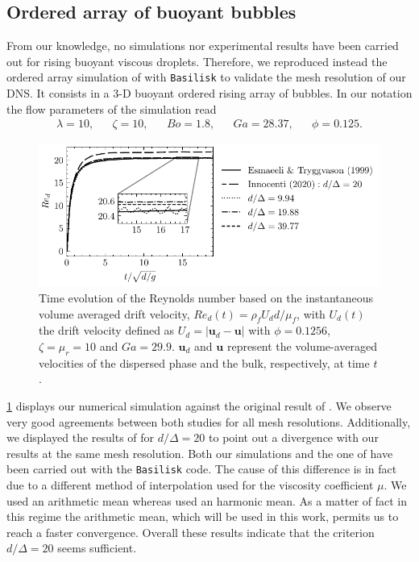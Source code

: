 \documentclass[11pt]{My_preprint}
\begin{document}
\subsection{Ordered array of buoyant bubbles}

From our knowledge, no simulations nor experimental results have been carried out for rising buoyant viscous droplets. 
Therefore, we reproduced instead the ordered array simulation of \citet{esmaeeli1999direct} with \texttt{Basilisk} to validate the mesh resolution of our DNS.  
It consists in a 3-D buoyant ordered rising array of bubbles. 
In our notation the flow parameters of the simulation read 
\begin{align*}
    \lambda = 10,
    && \zeta = 10,
    && Bo = 1.8,
    && Ga = 28.37,
    && \phi = 0.125.
\end{align*}
\begin{figure}[h!]
    \centering
    \includegraphics[height = 0.3\textwidth]{image/VALIDATION2.0/Loisy/Re.pdf}
    \caption{Time evolution of the Reynolds number based on the instantaneous volume averaged drift velocity, $Re_d(t) = \rho_fU _dd /\mu_f$, with $U_d(t)$ the drift velocity defined as $U_d = |\textbf{u}_d - \textbf{u}|$ with $\phi = 0.1256$, $\zeta =\mu_r =10$ and $Ga = 29.9$. $\textbf{u}_d$ and $\textbf{u}$ represent the volume-averaged velocities of the dispersed phase and the bulk, respectively, at time $t$.}
\label{fig:ordered_array}
\end{figure}
\ref{fig:ordered_array} displays our numerical simulation against the original result of \citet{esmaeeli1999direct}.
We observe very good agreements between both studies for all mesh resolutions.
Additionally, we displayed the results of \citet{innocenti2020direct} for $d/\Delta = 20$ to point out a divergence with our results at the same mesh resolution.  
Both our simulations and the one of \citet{innocenti2020direct} have been carried out with the  \texttt{Basilisk} code. 
The cause of this difference is in fact due to a different method of interpolation used for the viscosity coefficient $\mu$. 
We used an arithmetic mean whereas \citet{innocenti2020direct} used an 
harmonic mean.
As a matter of fact in this regime the arithmetic mean, which will be used in this work, permits us to reach a faster convergence. 
Overall these results indicate that the criterion $d/\Delta = 20$ seems sufficient.
\end{document}
